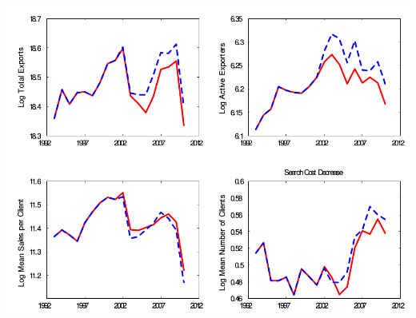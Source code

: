 \documentclass[notes=show]{beamer}
\begin{document}
\begin{frame}%

\begin{center}
%
    \includegraphics[scale=0.3]{figs/reduction_in_search_costs.png}
\end{center}

\end{frame}%
\end{document}
